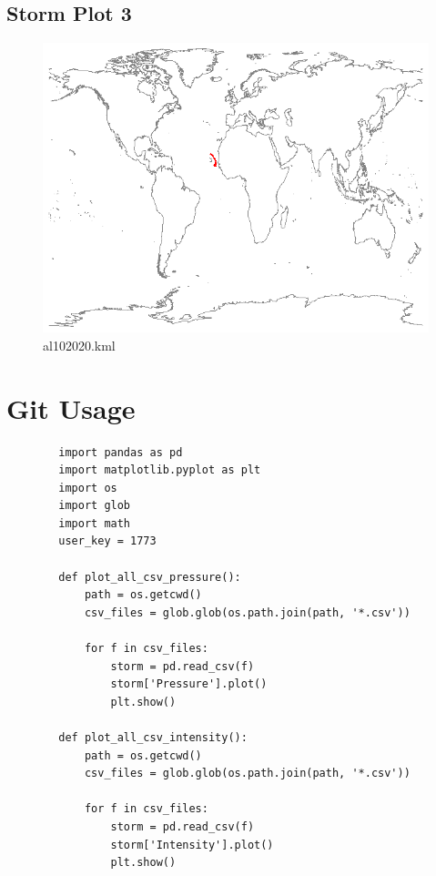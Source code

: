 \documentclass[]{article}
\begin{document}
\clearpage
\subsection{Storm Plot 3}

\begin{figure}[htbp]
    \centering
\includegraphics{al102020.png}
\caption{al102020.kml}
\label{fig:al102020}
\end{figure}
\clearpage
\section{Git Usage}
\begin{tcolorbox}[enhanced, 
    listing only,
    title=Python Code for Plotting CSV Data,
    fonttitle=\bfseries,
    colback=white,
    colframe=black!70,
    listing options={
      language=Python,
      numbers=left, 
      numberstyle=\tiny\color{gray},
      breaklines=true, 
      basicstyle=\ttfamily\small, 
      columns=fullflexible,
      keepspaces=true,
      showstringspaces=true,
    },]
    \begin{verbatim}
        import pandas as pd
        import matplotlib.pyplot as plt
        import os
        import glob
        import math
        user_key = 1773
        
        def plot_all_csv_pressure():
            path = os.getcwd()
            csv_files = glob.glob(os.path.join(path, '*.csv'))
            
            for f in csv_files:
                storm = pd.read_csv(f)
                storm['Pressure'].plot()
                plt.show()
        
        def plot_all_csv_intensity():
            path = os.getcwd()
            csv_files = glob.glob(os.path.join(path, '*.csv'))
            
            for f in csv_files:
                storm = pd.read_csv(f)
                storm['Intensity'].plot()
                plt.show()
    \end{verbatim}
\end{tcolorbox}
\end{document}
